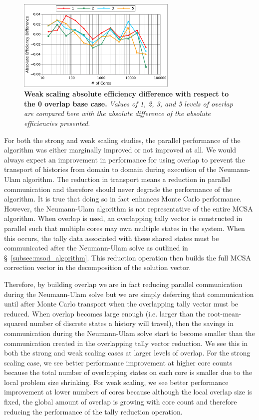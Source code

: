 \documentclass{snamc2013}
\begin{document}
\begin{figure}[h!]
  \begin{center}
    \includegraphics[width=3in]{titan_weak_overlap_diff.pdf}
  \end{center}
  \caption{\textbf{Weak scaling absolute efficiency difference with
      respect to the 0 overlap base case.} \textit{Values of 1, 2, 3,
      and 5 levels of overlap are compared here with the absolute
      difference of the absolute efficiencies presented.}}
  \label{fig:titan_weak_overlap_diff}
\end{figure}

For both the strong and weak scaling studies, the parallel performance
of the algorithm was either marginally improved or not improved at
all. We would always expect an improvement in performance for using
overlap to prevent the transport of histories from domain to domain
during execution of the Neumann-Ulam algorithm. The reduction in
transport means a reduction in parallel communication and therefore
should never degrade the performance of the algorithm. It is true that
doing so in fact enhances Monte Carlo performance. However, the
Neumann-Ulam algorithm is not representative of the entire MCSA
algorithm. When overlap is used, an overlapping tally vector is
constructed in parallel such that multiple cores may own multiple
states in the system. When this occurs, the tally data associated with
these shared states must be communicated after the Neumann-Ulam solve
as outlined in \S~\ref{subsec:msod_algorithm}. This reduction
operation then builds the full MCSA correction vector in the
decomposition of the solution vector. 

Therefore, by building overlap we are in fact reducing parallel
communication during the Neumann-Ulam solve but we are simply
deferring that communication until after Monte Carlo transport when
the overlapping tally vector must be reduced. When overlap becomes
large enough (i.e. larger than the root-mean-squared number of
discrete states a history will travel), then the savings in
communication during the Neumann-Ulam solve start to become smaller
than the communication created in the overlapping tally vector
reduction. We see this in both the strong and weak scaling cases at
larger levels of overlap. For the strong scaling case, we see better
performance improvement at higher core counts because the total number
of overlapping states on each core is smaller due to the local problem
size shrinking. For weak scaling, we see better performance
improvement at lower numbers of cores because although the local
overlap size is fixed, the global amount of overlap is growing with
core count and therefore reducing the performance of the tally
reduction operation.
\end{document}
